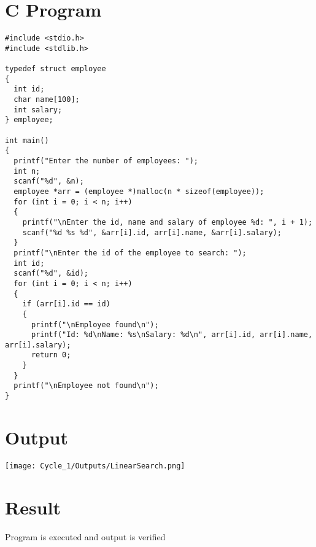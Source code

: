 \section{C Program}
\begin{lstlisting}[label={list:c_program:employee_search}]
#include <stdio.h>
#include <stdlib.h>

typedef struct employee
{
  int id;
  char name[100];
  int salary;
} employee;

int main()
{
  printf("Enter the number of employees: ");
  int n;
  scanf("%d", &n);
  employee *arr = (employee *)malloc(n * sizeof(employee));
  for (int i = 0; i < n; i++)
  {
    printf("\nEnter the id, name and salary of employee %d: ", i + 1);
    scanf("%d %s %d", &arr[i].id, arr[i].name, &arr[i].salary);
  }
  printf("\nEnter the id of the employee to search: ");
  int id;
  scanf("%d", &id);
  for (int i = 0; i < n; i++)
  {
    if (arr[i].id == id)
    {
      printf("\nEmployee found\n");
      printf("Id: %d\nName: %s\nSalary: %d\n", arr[i].id, arr[i].name, arr[i].salary);
      return 0;
    }
  }
  printf("\nEmployee not found\n");
}
\end{lstlisting}

\section{Output}
\texttt{[image: Cycle\_1/Outputs/LinearSearch.png]}

\section{Result}
Program is executed and output is verified